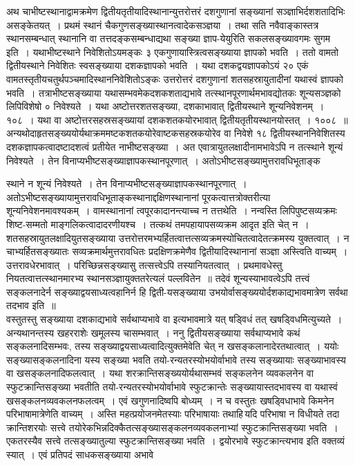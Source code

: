 \documentclass[11pt, openany]{book}
\begin{document}
\vspace{-3mm}
 अथ चाभीष्टस्थानाद्वामक्रमेण द्वितीयतृतीयादिस्थानान्युत्तरोत्तरं दशगुणानां सङ्ख्यानां सञ्ज्ञाभिर्दशशतादिभिः असङ्केतयत्~। प्रथमं स्थानं चैकगुणसङ्ख्यास्थानत्वादेकसञ्ज्ञया~। तथा सति नवैवाङ्कास्तत्र स्थानसम्बन्धात् स्थानानि वा तत्तदङ्कसम्बन्धाद्यथा सङ्ख्या ज्ञाप-येयुरिति सकलसङ्ख्यावगमः 
सुगम इति~। यथाभीष्टस्थाने निवेशितोऽयमङ्कः ३ एकगुणायास्त्रित्वसङ्ख्याया
ज्ञापको भवति~। ततो वामतो द्वितीयस्थाने निवेशितः स्वसङ्ख्याया 
दशकज्ञापको भवति~। यथा दशकद्वयज्ञापकोऽयं २० एकं वामतस्तृतीयचतुर्थपञ्चमादिस्थाननिवेशितोऽङ्कः उत्तरोत्तरं दशगुणानां
शतसहस्रायुतादीनां यथास्वं ज्ञापको भवति~। तत्राभीष्टसङ्ख्याया यथासम्भवमेकदशकशताद्यभावे तत्स्थानपूरणार्थमभावद्योतकः शून्यसञ्ज्ञको लिपिविशेषो ० निवेश्यते~। यथा अष्टोत्तरशतसङ्ख्या, दशकाभावात् द्वितीयस्थाने शून्यनिवेशनम्~। १०८~। यथा वा अष्टोत्तरसहस्रसङ्ख्यायां दशकशतकयोरभावात् द्वितीयतृतीयस्थानयोस्तत्~। १००८~॥
अन्यथोदाहृतसङ्ख्ययोर्यथाक्रममष्टकशतकयोरेवाष्टकसहस्रकयोरेव 
वा निवेशे १८ द्वितीयस्थाननिवेशितस्य दशकज्ञापकत्वादष्टादशत्वं प्रतीयेत 
नाभीष्टसङ्ख्या~। अत एवात्रायुतलक्षादीनामभावेऽपि न तत्स्थाने शून्यं
निवेश्यते~। तेन विनाप्यभीष्टसङ्ख्याज्ञापकस्थानपूरणात्~।
अतोऽभीष्टसङ्ख्यामुत्तरावधिभूताङ्क\textendash
\newpage

\noindent स्थाने न शून्यं निवेश्यते~। तेन विनाप्यभीष्टसङ्ख्याज्ञापकस्थानपूरणात्~। अतोऽभीष्टसङ्ख्यायामुत्तरावधिभूताङ्कस्थानाद्दक्षिणस्थानानां पूरकत्वात्तत्रोक्तरीत्या शून्यनिवेशनमावश्यकम्~। वामस्थानानां त्वपूरकादानन्त्याच्च न तत्तथेति~। नन्वस्ति लिपिपुष्टसव्यक्रमः शिष्ट-सम्मतो माङ्गलिकत्वादादरणीयश्च~। तत्कथं तमपहायापसव्यक्रम आदृत इति चेत् न~। शतसहस्रायुतलक्षादियुतसङ्ख्याया उत्तरोत्तरमभ्यर्हितत्वात्तत्सव्यक्रमस्योचितत्वादेतत्क्रमस्य युक्तत्वात्~। न चाभ्यर्हितसङ्ख्यातः सव्यक्रमार्थमुत्तरावधितः प्रदक्षिणक्रमेणैव द्वितीयादिस्थानानां सञ्ज्ञा अस्त्विति वाच्यम्~। उत्तरावधेरभावात्~। परिच्छिन्नसङ्ख्यासु तत्सत्त्वेऽपि तस्यानियतत्वात्~। प्रथमावधेस्तु नियतत्वात्तत्स्थानमारभ्य स्थानसञ्ज्ञायुक्ततरेत्यलं पल्लवितेन~॥ तदेवं शून्यस्याभावत्वेऽपि तत्त्वं सङ्कलनादेर्न सङ्ख्याद्वयसाध्यत्वहानिर्न हि द्विती-यसङ्ख्याया उभयोर्वासङ्ख्ययोर्दशकाद्यभावमात्रेण सर्वथा तदभाव इति~॥ \\

\vspace{-3mm}
 वस्तुतस्तु सङ्ख्याया दशकाद्यभावे सर्वथाप्यभावे वा इत्यभावमात्रे 
यत् षड्विधं तत् खषड्विधमित्युच्यते~। अन्यथानन्तस्य खहरराशेः खमूलस्य 
चासम्भवात्~। ननु द्वितीयसङ्ख्याया सर्वथाप्यभावे कथं सङ्कलनादिसम्भवः, 
तस्य सङ्ख्याद्वयसाध्यत्वादित्युक्तमेवेति चेत् न खसङ्कलानादेरतथात्वात्~। 
ययोः सङ्ख्यासङ्कलनादिना यस्य सङ्ख्या भवति तयो-रन्यतरस्योभयोर्वाभावे 
तस्य सङ्ख्यायाः सङ्ख्याभावस्य वा खसङ्कलनादिफलत्वात्~। यथा
शरक्रान्तिसङ्ख्ययोर्यथासम्भवं सङ्कलनेन व्यवकलनेन वा स्फुटक्रान्तिसङ्ख्या भवतीति तयो-रन्यतरस्योभयोर्वाभावे स्फुटक्रान्तेः सङ्ख्यायास्तदभावस्य वा यथास्वं
खसङ्कलनव्यवकलनफलत्वम्~। एवं खगुणनादिष्वपि बोध्यम्~। न च वस्तुतः 
खषड्विधाभावे किमनेन परिभाषामात्रेणेति वाच्यम्~। अस्ति महत्प्रयोजनमेतस्याः परिभाषायाः तथाहि\textendash \,यदि परिभाषा न विधीयते \;तदा \;क्रान्तिशरयोः \;सत्त्वे \;तयोरेकभिन्नदिक्कैतत्सङ्ख्यासङ्कलनव्यवकलनाभ्यां स्फुटक्रान्तिसङ्ख्या भवति~। एकतरस्यैव सत्त्वे तत्सङ्ख्यातुल्या स्फुटक्रान्तिसङ्ख्या भवति~। द्वयोरभावे स्फुटक्रान्त्यभाव इति वक्तव्यं स्यात्~। एवं प्रतिपदं साधकसङ्ख्याया अभावे
\newpage
\end{document}
